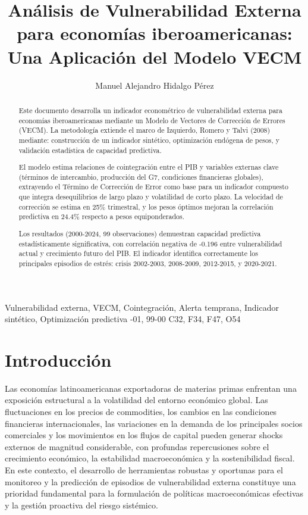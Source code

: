 \documentclass[3p,11pt]{elsarticle}
\begin{document}
\begin{frontmatter}

\title{Análisis de Vulnerabilidad Externa para economías iberoamericanas: Una Aplicación del Modelo VECM}

\author[inst1]{Manuel Alejandro Hidalgo Pérez}
\address[inst1]{Departamento de Economía, Universidad Pablo de Olavide, Sevilla, España}

\begin{abstract}
Este documento desarrolla un indicador econométrico de vulnerabilidad externa para economías iberoamericanas mediante un Modelo de Vectores de Corrección de Errores (VECM). La metodología extiende el marco de Izquierdo, Romero y Talvi (2008) mediante: construcción de un indicador sintético, optimización endógena de pesos, y validación estadística de capacidad predictiva.

El modelo estima relaciones de cointegración entre el PIB y variables externas clave (términos de intercambio, producción del G7, condiciones financieras globales), extrayendo el Término de Corrección de Error como base para un indicador compuesto que integra desequilibrios de largo plazo y volatilidad de corto plazo. La velocidad de corrección se estima en 25\% trimestral, y los pesos óptimos mejoran la correlación predictiva en 24.4\% respecto a pesos equiponderados.

Los resultados (2000-2024, 99 observaciones) demuestran capacidad predictiva estadísticamente significativa, con correlación negativa de -0.196 entre vulnerabilidad actual y crecimiento futuro del PIB. El indicador identifica correctamente los principales episodios de estrés: crisis 2002-2003, 2008-2009, 2012-2015, y 2020-2021.
\end{abstract}

\begin{keyword}
Vulnerabilidad externa, VECM, Cointegración, Alerta temprana, Indicador sintético, Optimización predictiva
-01, 99-00
\JEL  C32, F34, F47, O54
\end{keyword}

\end{frontmatter}

\section{Introducción}

Las economías latinoamericanas exportadoras de materias primas enfrentan una exposición estructural a la volatilidad del entorno económico global. Las fluctuaciones en los precios de commodities, los cambios en las condiciones financieras internacionales, las variaciones en la demanda de los principales socios comerciales y los movimientos en los flujos de capital pueden generar shocks externos de magnitud considerable, con profundas repercusiones sobre el crecimiento económico, la estabilidad macroeconómica y la sostenibilidad fiscal. En este contexto, el desarrollo de herramientas robustas y oportunas para el monitoreo y la predicción de episodios de vulnerabilidad externa constituye una prioridad fundamental para la formulación de políticas macroeconómicas efectivas y la gestión proactiva del riesgo sistémico.
\end{document}
